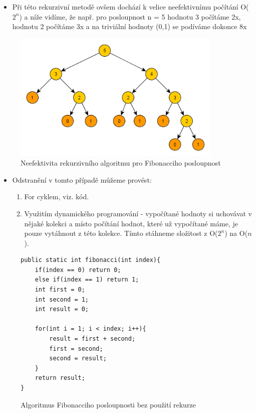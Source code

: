 \documentclass[10pt,a4paper]{article}
\begin{document}
\begin{itemize}
\item Při této rekurzivní metodě ovšem dochází k velice neefektivnímu počítání O($2^n$) a níže vidíme, že např. pro posloupnost n = 5 hodnotu 3 počítáme 2x, hodnotu 2 počítáme 3x a na triviální hodnoty (0,1) se podíváme dokonce 8x
\end{itemize}

\begin{figure}[ht]
    \centering
    \includegraphics[width=10cm]{fibonacci.png}
    \caption{Neefektivita rekurzivního algoritmu pro Fibonacciho posloupnost}
    \label{fig:fibonacciNeefektivita}
\end{figure}

\begin{itemize}
\item Odstranění v tomto případě můžeme provést:
\begin{enumerate}
\item For cyklem, viz. kód.
\item Využitím dynamického programování - vypočítané hodnoty si uchovávat v nějaké kolekci a místo počítání hodnot, které už vypočítané máme, je pouze vytáhnout z této kolekce. Tímto stáhneme složitost z O($2^n$) na O($n$).
\end{enumerate}
\end{itemize}
\begin{figure}[ht]
\centering
\begin{lstlisting}
public static int fibonacci(int index){
    if(index == 0) return 0;
    else if(index == 1) return 1;
    int first = 0;
    int second = 1;
    int result = 0;
    
    for(int i = 1; i < index; i++){
        result = first + second;
        first = second;
        second = result;
    }
    return result;
}
\end{lstlisting}
    \caption{Algoritmus Fibonacciho posloupnosti bez použití rekurze}
    \label{src:fibonacciBezRekurze}
\end{figure}
\end{document}
